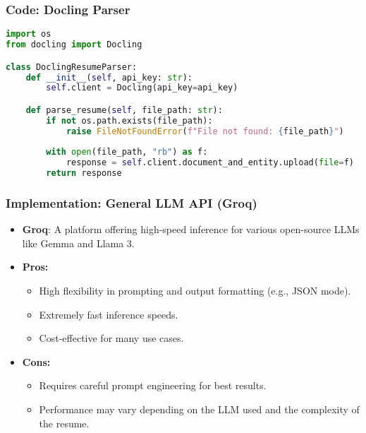 \begin{frame}[fragile]\frametitle{Code: Docling Parser}
    \begin{lstlisting}[language=Python, caption={llm\_parsing\_docling.py}]
import os
from docling import Docling

class DoclingResumeParser:
    def __init__(self, api_key: str):
        self.client = Docling(api_key=api_key)

    def parse_resume(self, file_path: str):
        if not os.path.exists(file_path):
            raise FileNotFoundError(f"File not found: {file_path}")
        
        with open(file_path, "rb") as f:
            response = self.client.document_and_entity.upload(file=f)
        return response
    \end{lstlisting}
\end{frame}

\begin{frame}[fragile]\frametitle{Implementation: General LLM API (Groq)}
    \begin{itemize}
        \item \textbf{Groq}: A platform offering high-speed inference for various open-source LLMs like Gemma and Llama 3.
        \item \textbf{Pros:}
        \begin{itemize}
            \item High flexibility in prompting and output formatting (e.g., JSON mode).
            \item Extremely fast inference speeds.
            \item Cost-effective for many use cases.
        \end{itemize}
        \item \textbf{Cons:}
        \begin{itemize}
            \item Requires careful prompt engineering for best results.
            \item Performance may vary depending on the LLM used and the complexity of the resume.
        \end{itemize}
    \end{itemize}
\end{frame}

